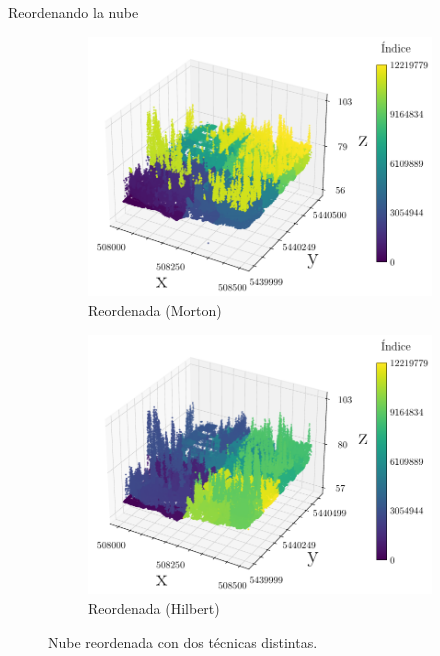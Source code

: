 \documentclass[aspectratio=169]{beamer}
\begin{document}
\begin{frame}{Reordenando la nube}
    \begin{figure}
        \centering
        \begin{subfigure}{0.45\textwidth}
            \centering
            \includegraphics[width=\linewidth]{img/plot_5080-54400_morton.pdf}
            \caption{Reordenada (Morton)}
        \end{subfigure}
        \hfill
        \begin{subfigure}{0.45\textwidth}
            \centering
            \includegraphics[width=\linewidth]{img/plot_5080-54400_hilbert.pdf}
            \caption{Reordenada (Hilbert)}
        \end{subfigure}
        \caption{Nube reordenada con dos técnicas distintas.}
    \end{figure}
\end{frame}
\end{document}
